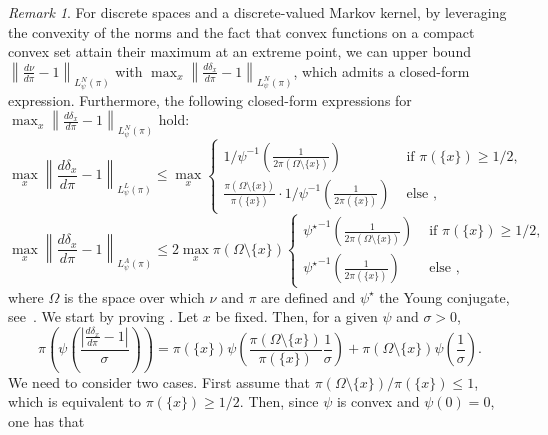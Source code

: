 \documentclass[11pt]{article}
\theoremstyle{plain}
\theoremstyle{remark}
\newtheorem{remark}{Remark}
\begin{document}
    \begin{remark}\label{rmk:maxNormsDiscrete}
        For discrete spaces and a discrete-valued Markov kernel, by leveraging the convexity of the norms and the fact that convex functions on a compact convex set attain their maximum at an extreme point, we can upper bound $\left\lVert  \frac{d\nu}{d\pi}-1\right\rVert_{L_\psi^{N}(\pi)}$ with $\max_x \left\lVert  \frac{d\delta_x}{d\pi}-1\right\rVert_{L_\psi^{N}(\pi)}$, which admits a closed-form expression. Furthermore, the following closed-form expressions for $\max_x \left\lVert  \frac{d\delta_x}{d\pi}-1\right\rVert_{L_\psi^{N}(\pi)}$ hold:
           \begin{equation}\label{eq:Lcs}
            \max_x \left\lVert  \frac{d\delta_x}{d\pi}-1\right\rVert_{L_\psi^{L}(\pi)} \leq \max_x \begin{cases}
                1/{\psi}^{-1}\left(\frac{1}{2\pi(\Omega\setminus\{x\})}\right) &\text{ if } \pi(\{x\})\geq 1/2,\\ 
                \frac{\pi(\Omega\setminus\{x\})}{\pi(\{x\})}\cdot 1/{\psi}^{-1}\left(\frac{1}{2\pi(\{x\})}\right) &\text{ else },
            \end{cases}
        \end{equation}   
       \begin{equation}
            \max_x \left\lVert  \frac{d\delta_x}{d\pi}-1\right\rVert_{L_\psi^{A}(\pi)} \leq 2\max_x \pi(\Omega\setminus\{x\})\begin{cases}
                {\psi^\star}^{-1}\left(\frac{1}{2\pi(\Omega\setminus\{x\})}\right) &\text{ if } \pi(\{x\})\geq 1/2,\\ 
                {\psi^\star}^{-1}\left(\frac{1}{2\pi(\{x\})}\right) &\text{ else },
            \end{cases}
        \end{equation}
         where $\Omega$ is the space over which $\nu$ and $\pi$ are defined and $\psi^\star$ the Young conjugate, see~.
   We start by proving . Let $x$ be fixed. Then, for a given $\psi$ and $\sigma>0$, 
    \begin{equation}
        \pi\left(\psi\left(\frac{\left|\frac{d\delta_x}{d\pi}-1\right|}{\sigma}\right)\right) = \pi(\{x\})\psi\left(\frac{\pi(\Omega\setminus\{x\})}{ \pi(\{x\})}\frac1\sigma\right)+\pi(\Omega\setminus\{x\})\psi\left(\frac1\sigma\right).
    \end{equation}
    We need to consider two cases. First assume that $\pi(\Omega\setminus\{x\})/\pi(\{x\}) \leq 1$, which is equivalent to $\pi(\{x\})\geq 1/2$. Then, since $\psi$ is convex and $\psi(0)=0$, one has that

\end{remark}
\end{document}
